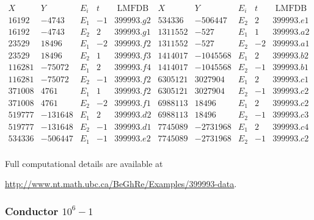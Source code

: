 $$
\begin{array}{c|c|c|c|c||c|c|c|c|c}
X & Y & E_i & t & \mbox{ LMFDB}  & X & Y & E_i & t & \mbox{ LMFDB} \\ \hline
16192 & -4743 & E_1 & -1 & 399993.g2 & 534336 & -506447 & E_2 & 2 & 399993.e1 \\
16192 & -4743 & E_2 & 2 & 399993.g1 & 1311552 & -527 & E_1 & 1 & 399993.a2 \\
23529 & 18496 & E_1 & -2 & 399993.f2  & 1311552 & -527 & E_2 & -2 & 399993.a1\\
23529 & 18496 & E_2 & 1 & 399993.f3 & 1414017 & -1045568 & E_1 & 2 & 399993.b2 \\
116281 & -75072 & E_1 & 2 & 399993.f4 & 1414017 & -1045568 & E_2 & -1 & 399993.b1 \\
116281 & -75072 & E_2 & -1 & 399993.f2 & 6305121 & 3027904 & E_1 & 2 & 399993.c1  \\
371008 & 4761 & E_1 & 1 & 399993.f2 & 6305121 & 3027904 & E_2 & -1 & 399993.c2 \\
371008 & 4761 & E_2 & -2 & 399993.f1& 6988113 & 18496 & E_1 & 2 & 399993.c2 \\
519777 & -131648 & E_1 & 2 & 399993.d2  & 6988113 & 18496 & E_2 & -1 & 399993.c3 \\
519777 & -131648 & E_2 & -1 & 399993.d1 & 7745089 & -2731968 & E_1 & 2 & 399993.c4\\
534336 & -506447 & E_1 & -1 & 399993.e2 & 7745089 & -2731968 & E_2 & -1 & 399993.c2 \\
\end{array}
$$

Full computational details are available at
\begin{center}
\url{http://www.nt.math.ubc.ca/BeGhRe/Examples/399993-data}.
\end{center}

\subsubsection{Conductor $10^6-1$}  \label{exe2}


